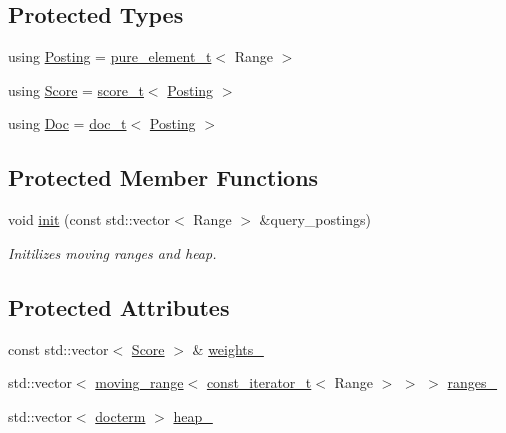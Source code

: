 \subsection*{Protected Types}
\begin{DoxyCompactItemize}
\item 
using \hyperlink{classirkit_1_1UnionRange_a5f694970419f5a60d7fd41d740556229}{Posting} = \hyperlink{namespaceirkit_afcffab67300c5c703cb38a363c9a6f1d}{pure\+\_\+element\+\_\+t}$<$ Range $>$
\item 
using \hyperlink{classirkit_1_1UnionRange_a47fb098a85581f5e33f4203e16245dae}{Score} = \hyperlink{namespaceirkit_a754dabe3346f950c948e7596d9d46c71}{score\+\_\+t}$<$ \hyperlink{classirkit_1_1UnionRange_a5f694970419f5a60d7fd41d740556229}{Posting} $>$
\item 
using \hyperlink{classirkit_1_1UnionRange_a387589b1f09868b60485c4ab8c61f97a}{Doc} = \hyperlink{namespaceirkit_a595d83053e112c98ab2a1b65e5dd74be}{doc\+\_\+t}$<$ \hyperlink{classirkit_1_1UnionRange_a5f694970419f5a60d7fd41d740556229}{Posting} $>$
\end{DoxyCompactItemize}
\subsection*{Protected Member Functions}
\begin{DoxyCompactItemize}
\item 
void \hyperlink{classirkit_1_1UnionRange_aabdf133213056f20e0526c6736dbff3e}{init} (const std\+::vector$<$ Range $>$ \&query\+\_\+postings)
\begin{DoxyCompactList}\small\item\em Initilizes moving ranges and heap. \end{DoxyCompactList}\end{DoxyCompactItemize}
\subsection*{Protected Attributes}
\begin{DoxyCompactItemize}
\item 
const std\+::vector$<$ \hyperlink{classirkit_1_1UnionRange_a47fb098a85581f5e33f4203e16245dae}{Score} $>$ \& \hyperlink{classirkit_1_1UnionRange_a0c53eb9b1c9e8aa18621f4c129a6ff90}{weights\+\_\+}
\item 
std\+::vector$<$ \hyperlink{structirkit_1_1moving__range}{moving\+\_\+range}$<$ \hyperlink{namespaceirkit_a4b1668583041117eb42c1b5a1091b804}{const\+\_\+iterator\+\_\+t}$<$ Range $>$ $>$ $>$ \hyperlink{classirkit_1_1UnionRange_acb9b9e969f1c90bb18bf1e4eb99f124b}{ranges\+\_\+}
\item 
std\+::vector$<$ \hyperlink{structirkit_1_1UnionRange_1_1docterm}{docterm} $>$ \hyperlink{classirkit_1_1UnionRange_a613eebb9b7b8601bffdad1d842c8c7f0}{heap\+\_\+}
\end{DoxyCompactItemize}


